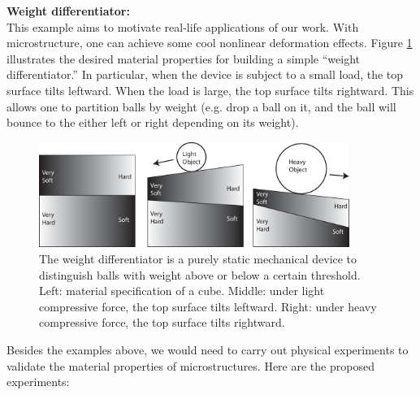 \begin{description}
\item{\bf Weight differentiator:}\\
This example aims to motivate real-life applications of our work.  With
microstructure, one can achieve some cool nonlinear deformation effects. Figure
\ref{fig:weight_differentiator} illustrates the desired material properties for
building a simple ``weight differentiator.''  In particular, when the device is
subject to a small load, the top surface tilts leftward.  When the load is large,
the top surface tilts rightward.  This allows one to partition balls by weight
(e.g. drop a ball on it, and the ball will bounce to the either left or right
depending on its weight).

\begin{figure}
\centering
\includegraphics[width=0.9\textwidth]{images/weight_differentiator}
\caption{
The weight differentiator is a purely static mechanical device to distinguish balls
with weight above or below a certain threshold.
Left: material specification of a cube.  Middle: under light
compressive force, the top surface tilts leftward.  Right: under heavy
compressive force, the top surface tilts rightward.}
\label{fig:weight_differentiator}
\end{figure}

\end{description}

Besides the examples above, we would need to carry out physical experiments to
validate the material properties of microstructures.  Here are the proposed
experiments:


